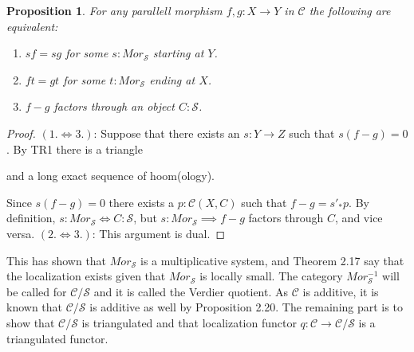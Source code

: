 \documentclass[12pt]{article}
\newtheorem{prop}[theorem]{Proposition}
\theoremstyle{definition}
\theoremstyle{remark}
\begin{document}
            \begin{prop}
                For any parallell morphism $f,g:X\rightarrow Y$ in $\mathcal{C}$ the following are equivalent:
                \begin{enumerate}
                    \item $sf=sg$ for some $s:Mor_\mathcal{S}$ starting at $Y$.
                    \item $ft=gt$ for some $t:Mor_\mathcal{S}$ ending at $X$.
                    \item $f-g$ factors through an object $C:\mathcal{S}$.
                \end{enumerate}
            \end{prop}

            \begin{proof}
                $(1.\iff 3.)$:
                Suppose that there exists an $s:Y\rightarrow Z$ such that $s(f-g)=0$. By TR1 there is a triangle  and a long exact sequence of hoom(ology).
                \begin{center}
                \end{center}
                Since $s(f-g)=0$ there exists a $p:\mathcal{C}(X,C)$ such that $f-g = s'_*p$. By definition, $s:Mor_\mathcal{S}\iff C:\mathcal{S}$, but $s:Mor_\mathcal{S}\implies f-g$ factors through $C$, and vice versa.
                $(2.\iff 3.)$:
                This argument is dual.
            \end{proof}

            This has shown that $Mor_\mathcal{S}$ is a multiplicative system, and Theorem 2.17 say that the localization exists given that $Mor_\mathcal{S}$ is locally small. The category $Mor_\mathcal{S}^{-1}$ will be called for $\mathcal{C}/\mathcal{S}$ and it is called the Verdier quotient. As $\mathcal{C}$ is additive, it is known that $\mathcal{C}/\mathcal{S}$ is additive as well by Proposition 2.20. The remaining part is to show that $\mathcal{C}/\mathcal{S}$ is triangulated and that localization functor $q:\mathcal{C}\rightarrow \mathcal{C}/\mathcal{S}$ is a triangulated functor.
\end{document}
